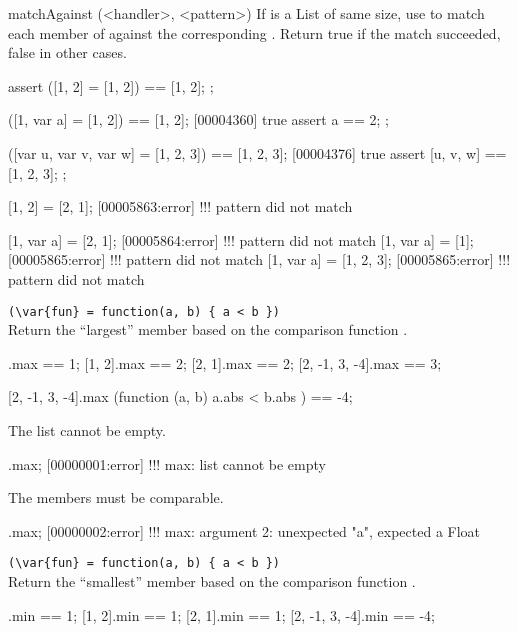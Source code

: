 \begin{urbiscriptapi}
\item[matchAgainst](<handler>, <pattern>)%
  If  is a List of same size, use  to match each
  member of \this against the corresponding .  Return true if
  the match succeeded, false in other cases.
\begin{urbiscript}
assert
{
  ([1, 2] = [1, 2]) == [1, 2];
};

([1, var a] = [1, 2]) == [1, 2];
[00004360] true
assert
{
  a == 2;
};

([var u, var v, var w] = [1, 2, 3]) == [1, 2, 3];
[00004376] true
assert
{
  [u, v, w] == [1, 2, 3];
};

[1, 2] = [2, 1];
[00005863:error] !!! pattern did not match

[1, var a] = [2, 1];
[00005864:error] !!! pattern did not match
[1, var a] = [1];
[00005865:error] !!! pattern did not match
[1, var a] = [1, 2, 3];
[00005865:error] !!! pattern did not match
\end{urbiscript}

\item {}\lstinline|(\var{fun} = function(a, b) { a < b })|\\%
  Return the ``largest'' member based on the comparison function .
\begin{urbiassert}
           [1].max == 1;
        [1, 2].max == 2;
        [2, 1].max == 2;
[2, -1, 3, -4].max == 3;

[2, -1, 3, -4].max (function (a, b) { a.abs < b.abs }) == -4;
\end{urbiassert}

The list cannot be empty.

\begin{urbiscript}
[].max;
[00000001:error] !!! max: list cannot be empty
\end{urbiscript}

The members must be comparable.
\begin{urbiscript}
[0, 2, "a", 1].max;
[00000002:error] !!! max: argument 2: unexpected "a", expected a Float
\end{urbiscript}

\item {}\lstinline|(\var{fun} = function(a, b) { a < b })|\\%
  Return the ``smallest'' member based on the comparison function .
\begin{urbiassert}
           [1].min == 1;
        [1, 2].min == 1;
        [2, 1].min == 1;
[2, -1, 3, -4].min == -4;


\end{urbiassert}
\end{urbiscriptapi}
